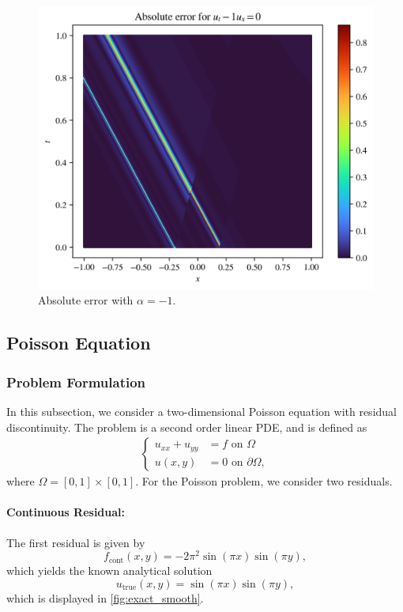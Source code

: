 \begin{figure}[h!]
    \centering
    \includegraphics[width=0.8\linewidth]{Project1XPINNs/figures/advection/-1_error.png}
    \caption{Absolute error with $\alpha=-1$.}
    \label{fig:alpha-1_error}
\end{figure}


\subsection{Poisson Equation}
\subsubsection{Problem Formulation}
In this subsection, we consider a two-dimensional Poisson equation with residual discontinuity.
The problem is a second order linear PDE, and is defined as
\begin{align}\label{eq:poisson}
\begin{cases}
    u_{xx}+u_{yy} &= f \text{ on } \Omega \\
    u(x,y) &= 0 \text{ on } \partial\Omega,
\end{cases}
\end{align}
where $\Omega = [0,1] \times [0,1]$.
For the Poisson problem, we consider two residuals.

\paragraph{Continuous Residual:}
The first residual is given by
\begin{equation}\label{eq:continuous_poisson}
    f_{\text{cont}}(x,y)= -2\pi^2\sin(\pi x) \sin(\pi y),
\end{equation}
which yields the known analytical solution
\begin{equation*}
    u_{\text{true}}(x,y)=\sin(\pi x) \sin(\pi y),
\end{equation*}
which is displayed in \autoref{fig:exact_smooth}.

